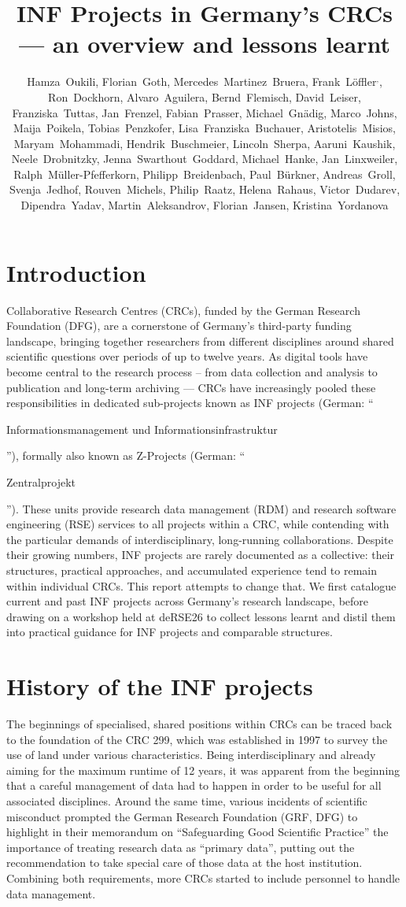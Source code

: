 \documentclass{eceasst}
\title{INF Projects in Germany's CRCs --- an overview and lessons learnt}
\author{
Hamza~Oukili\authorOrcid{0000-0003-4695-8532}\authorRef{1},
Florian~Goth\authorOrcid{0000-0003-2707-4790}\authorRef{2},
Mercedes~Martinez~Bruera\authorOrcid{0009-0004-2891-7045}\authorRef{3},
Frank~Löffler\authorOrcid{0000-0001-6643-6323}\authorRef{4}${}^,$\authorRef{5},
Ron~Dockhorn\authorOrcid{0000-0002-5268-5430}\authorRef{6},
Alvaro~Aguilera\authorOrcid{0000-0001-9324-8555}\authorRef{6},
Bernd~Flemisch\authorOrcid{0000-0001-8188-620X}\authorRef{1},
David~Leiser\authorOrcid{0000-0003-0949-8194}\authorRef{7},
Franziska~Tuttas\authorOrcid{0000-0003-3898-0908}\authorRef{7},
Jan~Frenzel\authorOrcid{0009-0007-5755-1427}\authorRef{6},
Fabian~Prasser\authorOrcid{0000-0003-3172-3095}\authorRef{8},
Michael~Gnädig\authorRef{8},
Marco~Johns\authorOrcid{0000-0003-4706-6595}\authorRef{8},
Maija~Poikela\authorOrcid{0000-0003-2616-4401}\authorRef{8}, 
Tobias~Penzkofer\authorOrcid{0000-0001-9591-8575}\authorRef{9}, 
Lisa~Franziska~Buchauer\authorOrcid{0000-0002-4722-8390}\authorRef{9},
Aristotelis~Misios\authorRef{9},
Maryam~Mohammadi\authorOrcid{0009-0007-8747-029X}\authorRef{10},
Hendrik~Buschmeier\authorOrcid{0000-0002-9613-5713}\authorRef{10},
Lincoln~Sherpa\authorOrcid{0009-0000-3287-0295}\authorRef{6},
Aaruni~Kaushik\authorOrcid{0009-0006-3061-6553}\authorRef{11},
Neele~Drobnitzky\authorOrcid{0000-0002-3181-941X}\authorRef{12},
Jenna~Swarthout~Goddard\authorOrcid{0000-0002-0181-0828}\authorRef{13},
Michael~Hanke\authorOrcid{0000-0001-6398-6370}\authorRef{13},
Jan~Linxweiler\authorOrcid{0000-0002-2755-5087}\authorRef{14},
Ralph~Müller-Pfefferkorn\authorOrcid{0000-0001-8719-5741}\authorRef{6},
Philipp~Breidenbach\authorOrcid{0000-0002-1506-7350}\authorRef{15},
Paul~Bürkner\authorOrcid{0000-0001-5765-8995}\authorRef{16},
Andreas~Groll\authorOrcid{0000-0001-6787-9118}\authorRef{16},
Svenja~Jedhof\authorOrcid{0009-0008-2939-9103}\authorRef{16},
Rouven~Michels\authorOrcid{0000-0002-5433-6197}\authorRef{16},
Philip~Raatz\authorOrcid{0000-0002-9133-0077}\authorRef{15},
Helena~Rahaus\authorOrcid{0009-0009-8843-8528}\authorRef{15},
Victor~Dudarev\authorOrcid{0000-0001-7243-9096}\authorRef{17},
Dipendra~Yadav\authorOrcid{0009-0004-4629-1277}\authorRef{18},
Martin~Aleksandrov\authorRef{19},
Florian~Jansen\authorOrcid{0000-0002-0331-5185}\authorRef{19},
Kristina~Yordanova\authorOrcid{0000-0002-6428-1062}\authorRef{18}
} %
\institute{%
\autlabel{1} Institute for Modeling Hydraulic and Environmental Systems (IWS), University of Stuttgart,
\autlabel{2} Institut für theoretische Physik 1, University of Würzburg,
\autlabel{3} Goethe-Universität Frankfurt am Main,
\autlabel{4} Heinz Nixdorf Chair for Distributed Information Systems, Friedrich Schiller University Jena,
\autlabel{5} de-RSE e.V. --- Society for Research Software in Germany,
\autlabel{6} Center for Interdisciplinary Digital Sciences, Technische Universität Dresden,
\autlabel{7} Institute of Space Systems (IRS), University of Stuttgart,
\autlabel{8} Berlin Institute of Health at Charité - Universitätsmedizin Berlin,
\autlabel{9} Charité - Universitätsmedizin Berlin,
\autlabel{10} Department of Linguistics, Bielefeld University, Bielefeld,
\autlabel{11} Fachbereich Mathematik, RPTU University Kaiserslautern-Landau, Kaiserslautern,
\autlabel{12} Heidelberg University Biochemistry Center (BZH), Heidelberg,
\autlabel{13} Forschungszentrum Jülich,
\autlabel{14} Technische Universität Braunschweig,
\autlabel{15} RWI - Leibniz Institute for Economic Research: Essen,
\autlabel{16} TU Dortmund University, Dortmund,
\autlabel{17} Materials Discovery and Interfaces (MDI), Ruhr University Bochum,
\autlabel{18} Institute of Data Science, University of Greifswald,
\autlabel{19} Faculty for Agriculture, Civil and Environmental Engineering, University of Rostock
}
\newenvironment{de}{\begin{otherlanguage}{ngerman}}{\end{otherlanguage}}
\begin{document}
\maketitle

\section{Introduction}

Collaborative Research Centres (CRCs), funded by the German Research Foundation (DFG), are a cornerstone of Germany's third-party funding landscape, bringing together researchers from different disciplines around shared scientific questions over periods of up to twelve years.
As digital tools have become central to the research process – from data collection and analysis to publication and long-term archiving — CRCs have increasingly pooled these responsibilities in dedicated sub-projects known as INF projects (German: “\begin{de}Informationsmanagement und Informationsinfrastruktur\end{de}”), formally also known as Z-Projects (German: “\begin{de}Zentralprojekt\end{de}”).
These units provide research data management (RDM) and research software engineering (RSE) services to all projects within a CRC, while contending with the particular demands of interdisciplinary, long-running collaborations.
Despite their growing numbers, INF projects are rarely documented as a collective: their structures, practical approaches, and accumulated experience tend to remain within individual CRCs.
This report attempts to change that.
We first catalogue current and past INF projects across Germany's research landscape, before drawing on a workshop held at deRSE26 to collect lessons learnt and distil them into practical guidance for INF projects and comparable structures.

\section{History of the INF projects}
\label{sec:history}
The beginnings of specialised, shared positions within CRCs can be traced back to the foundation of the CRC 299, which was established in 1997 to survey the use of land under various characteristics.
Being interdisciplinary and already aiming for the maximum runtime of 12 years, it was apparent from the beginning \cite{mueckschel2006} that a careful management of data had to happen in order to be useful for all associated disciplines.
Around the same time, various incidents of scientific misconduct prompted the German Research Foundation (GRF, DFG) to highlight in their
memorandum on ``Safeguarding Good Scientific Practice'' \cite{DFG1998}
the importance of treating research data as ``primary data'', putting out the recommendation to take special care of those data at the host institution.
Combining both requirements, more CRCs started to include personnel to handle data management.
\end{document}
